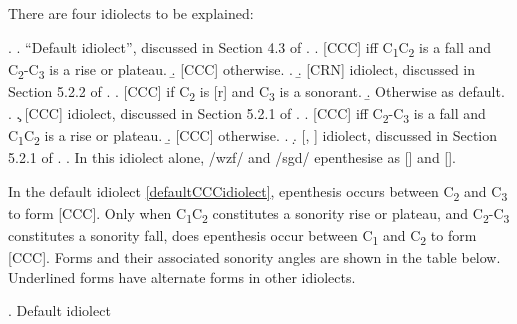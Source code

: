 \documentclass[12pt]{article}
\begin{document}
There are four idiolects to be explained:

\ex. \a. ``Default idiolect'', discussed in Section 4.3 of \citep{rose.2000}. \label{defaultCCCidiolect}
           \a. [CCC] iff C\textsubscript{1}C\textsubscript{2} is a fall and C\textsubscript{2}-C\textsubscript{3} is a rise or plateau.
           \b. [CCC] otherwise.
           \z.
     \b. [CRN] idiolect, discussed in Section 5.2.2 of \citep{rose.2000}. \label{CRNidiolect}
           \a. [CCC] if C\textsubscript{2} is [r] and C\textsubscript{3} is a sonorant.
           \b. Otherwise as default.
           \z.
     \c. [CCC] idiolect, discussed in Section 5.2.1 of \citep{rose.2000}. \label{C1CCidiolect}
           \a. [CCC] iff C\textsubscript{2}-C\textsubscript{3} is a fall and C\textsubscript{1}C\textsubscript{2} is a rise or plateau.
           \b. [CCC] otherwise.
           \z.
     \d. [, ] idiolect, discussed in Section 5.2.1 of \citep{rose.2000}. \label{wizfidiolect}
          \a. In this idiolect alone, /wzf/ and /sgd/ epenthesise as [] and  [].

\bigskip

 In the default idiolect \ref{defaultCCCidiolect}, epenthesis occurs between C\textsubscript{2} and C\textsubscript{3} to form [CCC].
Only when C\textsubscript{1}C\textsubscript{2} constitutes a sonority rise or plateau, and C\textsubscript{2}-C\textsubscript{3} constitutes a sonority fall, does epenthesis occur between C\textsubscript{1} and C\textsubscript{2} to form [CCC]. Forms and their associated sonority angles are shown in the table below. Underlined forms have alternate forms in other idiolects.

\ex. Default idiolect
\end{document}
